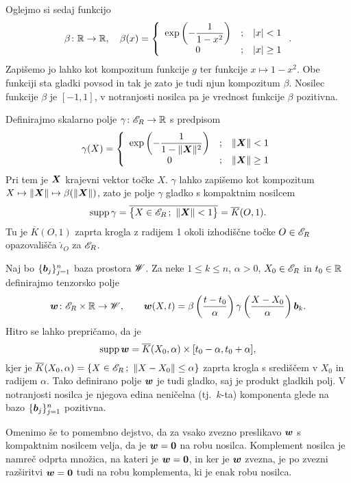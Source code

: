 Oglejmo si sedaj funkcijo
\[
	\beta\colon\mathbb R\to\mathbb R,\quad \beta(x)=\left\{\begin{array}{ccl}
	\exp\left(-\dfrac{1}{1-x^2}\right)&;&|x|<1 \\ 0&;&|x|\geq 1 \end{array}\right. .
\]
Zapišemo jo lahko kot kompozitum funkcije $g$ ter funkcije $x\mapsto 1-x^2$. Obe funkciji sta
gladki povsod in tak je zato je tudi njun kompozitum $\beta$. Nosilec funkcije $\beta$ je
$[-1,1]$, v notranjosti nosilca pa je vrednost funkcije $\beta$ pozitivna.

Definirajmo skalarno polje $\gamma\colon\mathscr E_R\to\mathbb R$ s predpisom
\[
	\gamma(X)=\left\{\begin{array}{ccl}
	\exp\left(-\dfrac{1}{1-\|\boldsymbol X\|^2}\right)&;&\|\boldsymbol X\|<1 \\ 0&;&\|\boldsymbol X\|\geq 1 \end{array}\right.
\]
Pri tem je $\boldsymbol X$ krajevni vektor točke $X$. $\gamma$
lahko zapišemo kot kompozitum $X\mapsto\|\boldsymbol X\|\mapsto \beta(\|\boldsymbol X\|)$, zato je polje
$\gamma$ gladko s kompaktnim nosilcem
\[ \textrm{supp}\,\gamma=\overline{\big\{X\in\E_R\,;\ \|\vek{X}\|<1 \big\}}=\overline{K}(O,1). \]
Tu je $\overline{K}(O,1)$ zaprta krogla z radijem 1 okoli izhodiščne točke $O\in\mathscr E_R$
opazovališča $\hat{\iota}_O$ za $\mathscr E_R$.

Naj bo $\{\boldsymbol b_j\}_{j=1}^{n}$ baza prostora $\mathscr W$. Za neke $1\leq k\leq n$, $\alpha>0$,
$X_0\in\mathscr E_R$ in $t_0\in\mathbb R$ definirajmo tenzorsko polje
\begin{equation} \label{e:funiw}
	\boldsymbol w\colon\mathscr E_R\times\mathbb R\to\mathscr W,\qquad\boldsymbol w(X,t)=\beta\left(\frac{t-t_0}{\alpha}\right)
	\gamma\left(\frac{X-X_0}{\alpha}\right)\boldsymbol b_k.
\end{equation}
Hitro se lahko prepričamo, da je
\begin{equation} \label{e:supaw}
	\mathrm{supp}\,\boldsymbol w=\overline{K}(X_0,\alpha)\times[t_0-\alpha,t_0+\alpha],
\end{equation}
kjer je $\overline{K}(X_0,\alpha)=\{X\in\E_R\,;\ \|X-X_0\|\leq\alpha\}$ zaprta krogla
s središčem v $X_0$ in radijem $\alpha$. Tako definirano polje $\boldsymbol w$ je
tudi gladko, saj je produkt gladkih polj. V notranjosti nosilca je njegova 
edina neničelna (tj.~$k$-ta) komponenta glede na bazo $\{\boldsymbol b_j\}_{j=1}^{n}$ pozitivna.

Omenimo še to pomembno dejstvo, da za vsako zvezno preslikavo $\boldsymbol w$ s kompaktnim
nosilcem velja, da je $\boldsymbol w=\boldsymbol 0$ na robu nosilca. Komplement nosilca je namreč odprta množica, na kateri
je $\boldsymbol w=\boldsymbol 0$, in ker je $\boldsymbol w$ zvezna, je po zvezni razširitvi $\boldsymbol w=\boldsymbol 0$ tudi na robu komplementa,
ki je enak robu nosilca.

